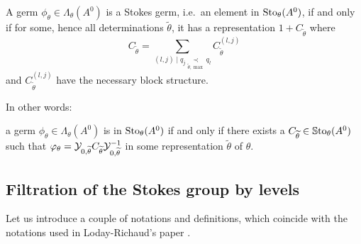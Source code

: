 \begin{cor}
  A germ $\phi_\theta\in\Lambda_\theta(A^0)$ is a Stokes germ, i.e.\ an element
  in $\operatorname{Sto}_\theta(A^0)$, if and only if for some, hence all determinations
  $\tilde\theta$, it has a representation $1+C_{\tilde\theta}$ where
  \[
    C_{\tilde\theta}=\sum_{(l,j)\mid q_j\underset{\tilde\theta,\max}{\prec}q_l}
    C_{\tilde\theta}^{(l,j)}
  \]
  and $C_{\tilde\theta}^{(l,j)}$ have the necessary block structure.

  In other words:
  \begin{einr}
    a germ $\phi_\theta\in\Lambda_\theta(A^0)$ is in $\operatorname{Sto}_\theta(A^0)$ if and
    only if there exists a $C_{\widetilde\theta}\in\operatorname{\mathbb{S}to}_\theta(A^0)$ such that
    $\varphi_\theta=\mathcal{Y}_{0,\widetilde\theta}C_{\widetilde\theta}\mathcal{Y}_{0,\widetilde\theta}^{-1}$
    in some representation $\tilde\theta$ of $\theta$.
  \end{einr}
\end{cor}

\subsection{Filtration of the Stokes group by levels}
Let us introduce a couple of notations and definitions, which coincide with the
notations used in Loday-Richaud's paper \cite{Loday1994}.

